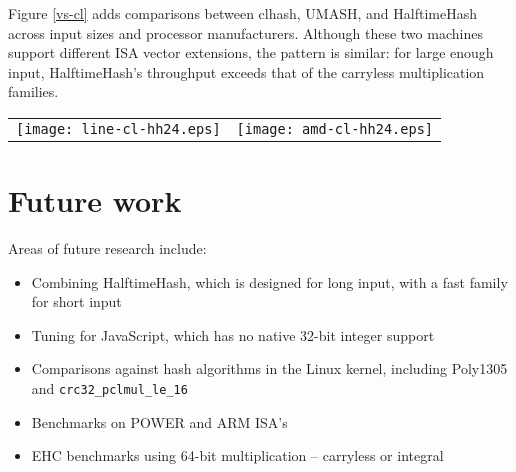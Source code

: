 \documentclass{llncs}
\begin{document}
Figure \ref{vs-cl} adds comparisons between clhash, UMASH, and HalftimeHash across input sizes and processor manufacturers.
Although these two machines support different ISA vector extensions, the pattern is similar: for large enough input, HalftimeHash's throughput exceeds that of the carryless multiplication families.
\begin{figure*}
\begin{tabular}{cc}
\texttt{[image: line-cl-hh24.eps]}
&
\texttt{[image: amd-cl-hh24.eps]}
\end{tabular}
\caption{
  \label{vs-cl}
  Comparison of Intel (i7-7800x) and AMD (EC2 c5a.large, 7R32) performance.
  On both chips HalftimeHash24 is faster than clhash and UMASH for long strings.
  The ``v3'' after the name of the AMD HalftimeHash indicates block size: v3 means a 256-bit block size, while v4 (the default) means 512-bit block size.
  AMD chips do not support AVX-512, but still HalftimeHash with 256-bit blocks exceeds the speed of clmul-based hashing methods by up to a factor of 2.
}
\end{figure*}

\section{Future work}

Areas of future research include:

\begin{itemize}
\item Combining HalftimeHash, which is designed for long input, with a fast family for short input
\item Tuning for JavaScript, which has no native 32-bit integer support
\item Comparisons against hash algorithms in the Linux kernel, including Poly1305 and \texttt{crc32\_pclmul\_le\_16}
\item Benchmarks on POWER and ARM ISA's
\item EHC benchmarks using 64-bit multiplication -- carryless or integral
\end{itemize}


\end{document}

